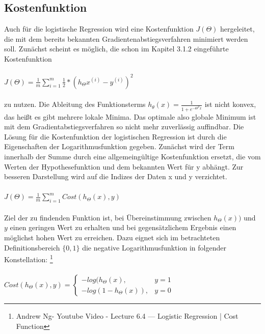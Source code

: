 \documentclass[a4paper]{scrreprt}
\begin{document}
\subsection{Kostenfunktion}
Auch für die logistische Regression wird eine Kostenfunktion $J(\Theta)$ hergeleitet, die mit dem bereits bekannten Gradientenabstiegsverfahren minimiert werden soll. Zunächst scheint es möglich, die schon im Kapitel 3.1.2 eingeführte Kostenfunktion
\\\\
$J(\Theta)=\frac{1}{m}\sum\limits_{i=1}^{m}\frac{1}{2}*(h_{\Theta}x^{(i)}-y^{(i)})^{2}$\\\\zu nutzen. Die Ableitung des Funktionsterms $h_\theta(x)=\frac{1}{1+e^{-\Theta^Tx}}$ ist nicht konvex, das heißt es gibt mehrere lokale Minima. Das optimale also globale Minimum ist mit dem Gradientabstiegsverfahren so nicht mehr zuverlässig auffindbar. Die Lösung für die Kostenfunktion der logistischen Regression ist durch die Eigenschaften der Logarithmusfunktion gegeben. Zunächst wird der Term innerhalb der Summe durch eine allgemeingültige Kostenfunktion ersetzt, die vom Werten der Hypothesefunktion und dem bekannten Wert für y abhängt. Zur besseren Darstellung wird auf die Indizes der Daten x und y verzichtet.\\\\
$J(\Theta)=\frac{1}{m}\sum\limits_{i=1}^{m}Cost(h_{\Theta}(x), y)$\\\\
Ziel der zu findenden Funktion ist, bei Übereinstimmung zwischen $h_{\Theta}(x))$ und $y$ einen geringen Wert zu erhalten und bei gegensätzlichem Ergebnis einen möglichst hohen Wert zu erreichen. Dazu eignet sich im betrachteten Definitionsbereich $\{0,1\}$ die negative Logarithmusfunktion in folgender Konstellation:
\footnote{Andrew Ng- Youtube Video - Lecture 6.4 — Logistic Regression |  Cost Function}
\\\\
$Cost(h_{\Theta}(x),y)=\left \{ \begin{array}{ll} -log(h_{\Theta}(x), & y=1\\ -log(1-h_{\Theta}(x)), & y=0 \end{array} \right.$\\
%
\end{document}
